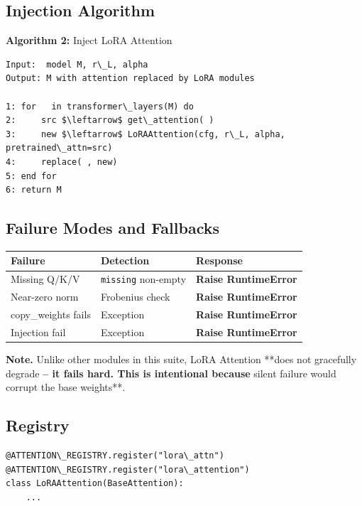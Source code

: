 \subsection{Injection Algorithm}

\textbf{Algorithm 2:} Inject LoRA Attention
\begin{lstlisting}
Input:  model M, r\_L, alpha
Output: M with attention replaced by LoRA modules

1: for   in transformer\_layers(M) do
2:     src $\leftarrow$ get\_attention( )
3:     new $\leftarrow$ LoRAAttention(cfg, r\_L, alpha, pretrained\_attn=src)
4:     replace( , new)
5: end for
6: return M
\end{lstlisting}

\subsection{Failure Modes and Fallbacks}

\begin{table}[H]
\centering
\small
\begin{tabular}{lll}
\toprule
\textbf{Failure} & \textbf{Detection} & \textbf{Response} \\
\midrule
Missing Q/K/V & \texttt{missing} non-empty & \textbf{Raise RuntimeError} \\
Near-zero norm & Frobenius check & \textbf{Raise RuntimeError} \\
copy\_weights fails & Exception & \textbf{Raise RuntimeError} \\
Injection fail & Exception & \textbf{Raise RuntimeError} \\
\bottomrule
\end{tabular}
\end{table}

\textbf{Note.} Unlike other modules in this suite, LoRA Attention **does not 
gracefully degrade\textbf{ -- it fails hard. This is intentional because }silent 
failure would corrupt the base weights**.

\subsection{Registry}

\begin{lstlisting}
@ATTENTION\_REGISTRY.register("lora\_attn")
@ATTENTION\_REGISTRY.register("lora\_attention")
class LoRAAttention(BaseAttention):
    ...
\end{lstlisting}

